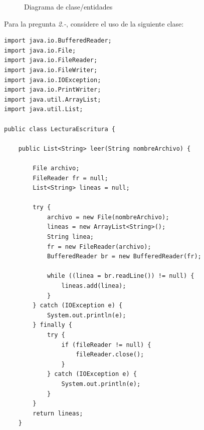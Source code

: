 \documentclass[10pt]{article}
\begin{document}
{    \begin{figure}[htbp!]
        \begin{center}
            \caption{{\scriptsize Diagrama de clase/entidades}}\label{fig:diagrama}
        \end{center}    
    \end{figure}
        \newpage
    Para la pregunta \emph{2.-}, considere el uso de la siguiente clase:
        \begin{multicols}{2}
            \begin{verbatim}
import java.io.BufferedReader;
import java.io.File;
import java.io.FileReader;
import java.io.FileWriter;
import java.io.IOException;
import java.io.PrintWriter;
import java.util.ArrayList;
import java.util.List;

public class LecturaEscritura {

    public List<String> leer(String nombreArchivo) {

        File archivo;
        FileReader fr = null;
        List<String> lineas = null;

        try {
            archivo = new File(nombreArchivo);
            lineas = new ArrayList<String>();
            String linea;
            fr = new FileReader(archivo);
            BufferedReader br = new BufferedReader(fr);

            while ((linea = br.readLine()) != null) {
                lineas.add(linea);
            }
        } catch (IOException e) {
            System.out.println(e);
        } finally {
            try {
                if (fileReader != null) {
                    fileReader.close();
                }
            } catch (IOException e) {
                System.out.println(e);
            }
        }
        return lineas;
    }


\end{verbatim}
\end{multicols}}
\end{document}
